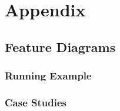 \appendix
\chapter{Appendix}
\label{appendix}

\section{Feature Diagrams}
\label{feature_diagrams}

\subsection{Running Example}



\subsection{Case Studies}

